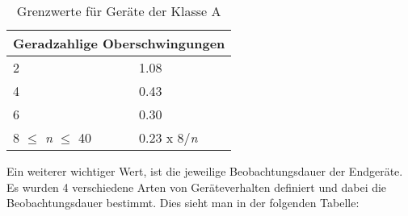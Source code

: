 \begin{table}[ht!]
\begin{tabular}{|l|l|}
		\multicolumn{2}{|c|}{Geradzahlige Oberschwingungen}                                                                                                                \\ \hline
		2                                            & 1.08                                                                                                                \\
		4                                            & 0.43                                                                                                                \\
		6                                            & 0.30                                                                                                                \\
		8 $\leq$ \textit{n} $\leq$ 40                & 0.23 x 8/\textit{n}                                                                                                 \\ \hline
	\end{tabular}
\caption{Grenzwerte für Geräte der Klasse A}\label{Test}
\end{table}


Ein weiterer wichtiger Wert, ist die jeweilige Beobachtungsdauer der Endgeräte. Es wurden 4 verschiedene Arten von Geräteverhalten definiert und dabei die Beobachtungsdauer bestimmt. Dies sieht man in der folgenden Tabelle:

